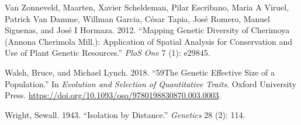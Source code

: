 \documentclass[
]{article}
\newlength{\cslhangindent}
\newlength{\cslentryspacingunit} %
\newenvironment{CSLReferences}[2] %
 {%
  \setlength{\parindent}{0pt}
  \ifodd #1
  \let\oldpar\par
  \def\par{\hangindent=\cslhangindent\oldpar}
  \fi
  \setlength{\parskip}{#2\cslentryspacingunit}
 }%
 {}
\begin{document}
\begin{CSLReferences}{1}{0}
\leavevmode{}%
Van Zonneveld, Maarten, Xavier Scheldeman, Pilar Escribano, Maria A
Viruel, Patrick Van Damme, Willman Garcia, César Tapia, José Romero,
Manuel Siguenas, and José I Hormaza. 2012. {``Mapping Genetic Diversity
of Cherimoya (Annona Cherimola Mill.): Application of Spatial Analysis
for Conservation and Use of Plant Genetic Resources.''} \emph{PloS One}
7 (1): e29845.

\leavevmode{}%
Walsh, Bruce, and Michael Lynch. 2018. {``{59The Genetic Effective Size
of a Population}.''} In \emph{{Evolution and Selection of Quantitative
Traits}}. Oxford University Press.
\url{https://doi.org/10.1093/oso/9780198830870.003.0003}.

\leavevmode{}%
Wright, Sewall. 1943. {``Isolation by Distance.''} \emph{Genetics} 28
(2): 114.

\end{CSLReferences}
\end{document}
